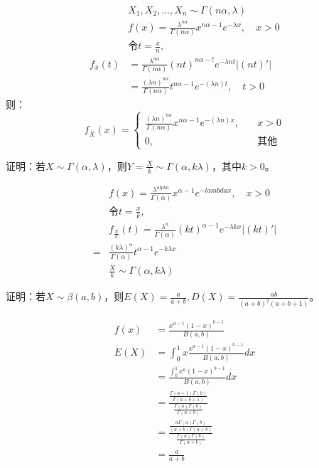   \xsv
  \[
    \begin{split}
      & X_1, X_2, \dots, X_n \sim \Gamma (n \alpha, \lambda)\\
      & f(x) = \frac{\lambda^{n \alpha}}{\Gamma (n \alpha)} x^{n \alpha - 1} e^{- \lambda x}, \quad x > 0\\
      & \text{令} t = \frac{x}{n},\\
      f_{\bar{x}}(t) &= \frac{\lambda^{n \alpha}}{\Gamma (n \alpha)} (nt)^{n \alpha - !} e^{-\lambda nt} |(nt)'|\\
       &= \frac{(\lambda n)^{n\alpha}}{\Gamma (n\alpha)} t^{n\alpha - 1} e^{-(\lambda n)t}, \quad t>0
    \end{split}
  \]
  则：
  \[
    f_{\bar{X}} (x) =
    \begin{cases}
      \frac{(\lambda n)^{n\alpha}}{\Gamma (n\alpha)} x^{n\alpha - 1} e^{-(\lambda n)x}, \quad &x>0\\
      0, \quad &\text{其他}
    \end{cases}
  \]

   证明：若$X \sim \Gamma (\alpha, \lambda)$，则$Y = \frac{X}{k} \sim \Gamma (\alpha, k\lambda)$，其中$k>0$。

  \xsv
  \[
    \begin{split}
      & f(x) = \frac{\lambda^{alpha}}{\Gamma (\alpha)} x^{\alpha -1} e^{-lambda x}, \quad x>0\\
      & \text{令} t=\frac{x}{k},\\
      & f_{\frac{X}{k}} (t) = \frac{\lambda^{\alpha}}{\Gamma (\alpha)} (kt)^{\alpha - 1} e^{-\lambda kx} |(kt)'|\\
      = & \frac{(k\lambda)^{\alpha}}{\Gamma (\alpha)} t^{\alpha - 1} e^{-k\lambda x}\\
      & \frac{X}{k} \sim \Gamma (\alpha, k\lambda)
    \end{split}
  \]


   证明：若$X \sim \beta (a, b)$，则$E(X) = \frac{a}{a+b}, D(X) = \frac{ab}{(a+b)^2(a+b+1)}$。

  \xsv
  \[
    \begin{split}
      f(x) &= \frac{x^{a-1} (1-x)^{b-1}}{B(a, b)}\\
      E(X) &= \int_0^1 x \frac{x^{a-1} (1-x)^{b-1}}{B(a, b)}dx\\
      &= \frac{\int_0^1 x^a (1-x)^{b-1}}{B(a, b)}dx\\
      &= \frac{\frac{\Gamma (a+1) \Gamma (b)}{\Gamma (a+b+1)}}{\frac{\Gamma (a) \Gamma (b)}{\Gamma (a+b)}}\\
      &= \frac{\frac{a \Gamma (a) \Gamma (b)}{(a+b) \Gamma (a+b)}}{\frac{\Gamma (a) \Gamma (b)}{\Gamma (a+b)}}\\
      &= \frac{a}{a+b}\\
    \end{split}
  \]

